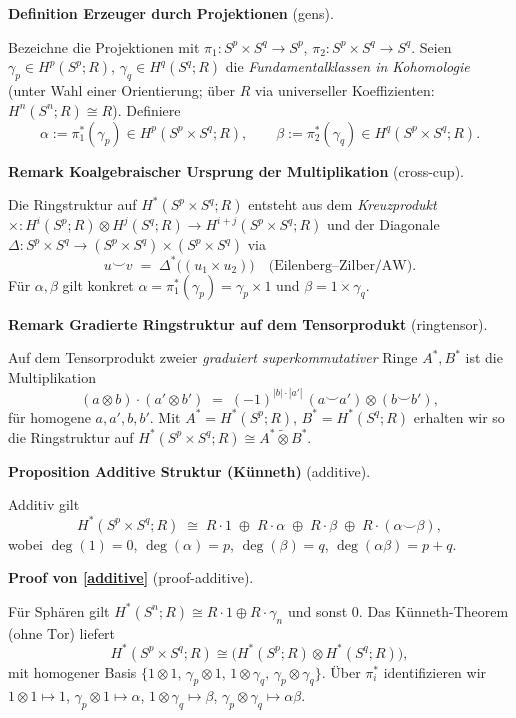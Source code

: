 \documentclass[10pt, letterpaper]{article}
\newcommand{\CustomHeading}[3]{%
  \par\medskip\noindent%
  \textbf{#1 #2} \textnormal{(#3)}.\enskip%
}
\newenvironment{DEF}[2]{\begin{unitbox}\CustomHeading{Definition}{#1}{#2}}{\end{unitbox}}
\newenvironment{PROP}[2]{\begin{unitbox}\CustomHeading{Proposition}{#1}{#2}}{\end{unitbox}}
\newenvironment{REM}[2]{\begin{unitbox}\CustomHeading{Remark}{#1}{#2}}{\end{unitbox}}
\newenvironment{PROOF}[2]{\begin{unitbox}\CustomHeading{Proof}{#1}{#2}}{\end{unitbox}}
\begin{document}
\begin{DEF}{Erzeuger durch Projektionen}{gens}
Bezeichne die Projektionen mit \(\pi_1:S^p\times S^q\to S^p\), \(\pi_2:S^p\times S^q\to S^q\).
Seien \(\gamma_p\in H^p(S^p;R)\), \(\gamma_q\in H^q(S^q;R)\) die \emph{Fundamentalklassen in Kohomologie} 
(unter Wahl einer Orientierung; über \(R\) via universeller Koeffizienten: \(H^n(S^n;R)\cong R\)). 
Definiere
\[
\alpha := \pi_1^\ast(\gamma_p)\in H^p(S^p\times S^q;R),
\qquad
\beta  := \pi_2^\ast(\gamma_q)\in H^q(S^p\times S^q;R).
\]
\end{DEF}

\begin{REM}{Ko\-algebraischer Ursprung der Multiplikation}{cross-cup}
Die Ringstruktur auf \(H^\ast(S^p\times S^q;R)\) entsteht aus dem \emph{Kreuzprodukt} 
\(\times: H^i(S^p;R)\otimes H^j(S^q;R)\to H^{i+j}(S^p\times S^q;R)\)
und der Diagonale \(\Delta:S^p\times S^q\to(S^p\times S^q)\times(S^p\times S^q)\) via
\[
u\smile v \;=\; \Delta^\ast\big((u_1\times u_2)\big)\quad\text{(Eilenberg–Zilber/AW)}.
\]
Für \(\alpha,\beta\) gilt konkret \(\alpha=\pi_1^\ast(\gamma_p)=\gamma_p\times 1\) und \(\beta=1\times\gamma_q\).
\end{REM}

\begin{REM}{Gradierte Ringstruktur auf dem Tensorprodukt}{ringtensor}
\label{rem:ringtensor}
Auf dem Tensorprodukt zweier \emph{graduiert superkommutativer} Ringe \(A^\ast,B^\ast\) ist die Multiplikation
\[
(a\otimes b)\cdot(a'\otimes b') \;=\; (-1)^{|b|\cdot|a'|}\,(a\smile a')\otimes(b\smile b'),
\]
für homogene \(a,a',b,b'\).
Mit \(A^\ast=H^\ast(S^p;R)\), \(B^\ast=H^\ast(S^q;R)\) erhalten wir so die Ringstruktur auf 
\(H^\ast(S^p\times S^q;R)\cong A^\ast\widetilde{\otimes}B^\ast\).
\end{REM}

\begin{PROP}{Additive Struktur (Künneth)}{additive}
Additiv gilt
\[
H^\ast(S^p\times S^q;R)\;\cong\;
R\cdot 1 \;\oplus\; R\cdot \alpha \;\oplus\; R\cdot \beta \;\oplus\; R\cdot (\alpha\smile\beta),
\]
wobei \(\deg(1)=0\), \(\deg(\alpha)=p\), \(\deg(\beta)=q\), \(\deg(\alpha\beta)=p+q\).
\end{PROP}

\begin{PROOF}{von \ref{additive}}{proof-additive}
Für Sphären gilt \(H^\ast(S^n;R)\cong R\cdot 1\oplus R\cdot \gamma_n\) und sonst \(0\).
Das Künneth-Theorem (ohne \(\mathrm{Tor}\)) liefert
\[
H^\ast(S^p\times S^q;R)\cong
\big(H^\ast(S^p;R)\otimes H^\ast(S^q;R)\big),
\]
mit homogener Basis \(\{1\otimes 1,\,\gamma_p\otimes 1,\,1\otimes\gamma_q,\,\gamma_p\otimes\gamma_q\}\).
Über \(\pi_i^\ast\) identifizieren wir 
\(1\otimes 1\mapsto 1\), \(\gamma_p\otimes 1\mapsto \alpha\), \(1\otimes\gamma_q\mapsto \beta\),
\(\gamma_p\otimes\gamma_q\mapsto \alpha\beta\).
\end{PROOF}
\end{document}
